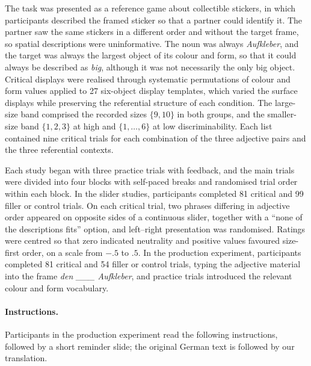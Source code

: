 \documentclass[10pt,a4paper,fleqn]{article}
\begin{document}
The task was presented as a reference game about collectible stickers, in which participants described the framed sticker so that a partner could identify it.
The partner saw the same stickers in a different order and without the target frame, so spatial descriptions were uninformative.
The noun was always \emph{Aufkleber}, and the target was always the largest object of its colour and form, so that it could always be described as \emph{big}, although it was not necessarily the only big object.
Critical displays were realised through systematic permutations of colour and form values applied to 27 six-object display templates, which varied the surface displays while preserving the referential structure of each condition.
The large-size band comprised the recorded sizes $\{9,10\}$ in both groups, and the smaller-size band $\{1,2,3\}$ at high and $\{1,\ldots,6\}$ at low discriminability.
Each list contained nine critical trials for each combination of the three adjective pairs and the three referential contexts.

Each study began with three practice trials with feedback, and the main trials were divided into four blocks with self-paced breaks and randomised trial order within each block.
In the slider studies, participants completed 81 critical and 99 filler or control trials.
On each critical trial, two phrases differing in adjective order appeared on opposite sides of a continuous slider, together with a ``none of the descriptions fits'' option, and left--right presentation was randomised.
Ratings were centred so that zero indicated neutrality and positive values favoured size-first order, on a scale from $-.5$ to $.5$.
In the production experiment, participants completed 81 critical and 54 filler or control trials, typing the adjective material into the frame \emph{den \_\_\_ Aufkleber}, and practice trials introduced the relevant colour and form vocabulary.

\paragraph{Instructions.}
\label{app:instructions}
Participants in the production experiment read the following instructions, followed by a short reminder slide; the original German text is followed by our translation.
\end{document}
